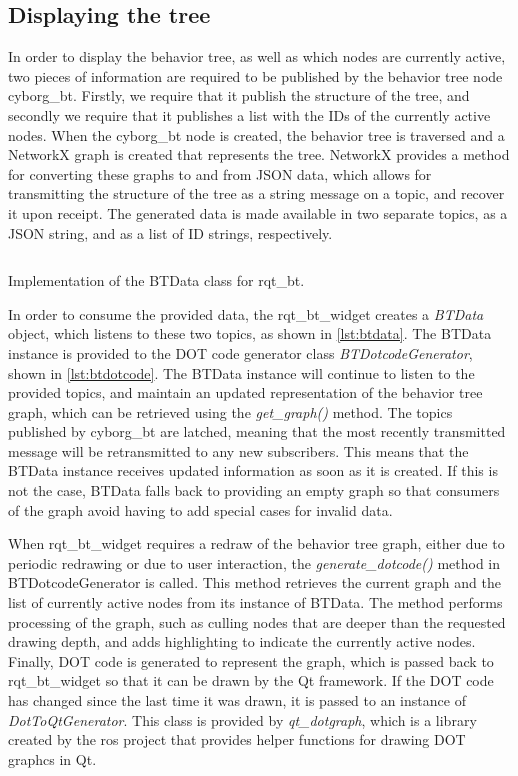 \documentclass[\rootfolder/main.tex]{subfiles}
\begin{document}
\subsection{Displaying the tree}

In order to display the behavior tree, as well as which nodes are currently active, two pieces of information are required to be published by the behavior tree node cyborg\_bt.
Firstly, we require that it publish the structure of the tree, and secondly we require that it publishes a list with the IDs of the currently active nodes.
When the cyborg\_bt node is created, the behavior tree is traversed and a NetworkX graph is created that represents the tree.
NetworkX provides a method for converting these graphs to and from JSON data, which allows for transmitting the structure of the tree as a string message on a topic, and recover it upon receipt.
The generated data is made available in two separate topics, as a JSON string, and as a list of ID strings, respectively.

\begin{listing}
    \inputminted{python}{\rootfolder/Chapters/Chapter4/Listings/btdata.py}
    \caption{Implementation of the BTData class for rqt\_bt.}
    \label{lst:btdata}
\end{listing}

In order to consume the provided data, the rqt\_bt\_widget creates a \emph{BTData} object, which listens to these two topics, as shown in \cref{lst:btdata}.
The BTData instance is provided to the DOT code generator class \emph{BTDotcodeGenerator}, shown in \cref{lst:btdotcode}.
The BTData instance will continue to listen to the provided topics, and maintain an updated representation of the behavior tree graph, which can be retrieved using the \emph{get\_graph()} method.
The topics published by cyborg\_bt are latched, meaning that the most recently transmitted message will be retransmitted to any new subscribers.
This means that the BTData instance receives updated information as soon as it is created.
If this is not the case, BTData falls back to providing an empty graph so that consumers of the graph avoid having to add special cases for invalid data.

When rqt\_bt\_widget requires a redraw of the behavior tree graph, either due to periodic redrawing or due to user interaction, the \emph{generate\_dotcode()} method in BTDotcodeGenerator is called.
This method retrieves the current graph and the list of currently active nodes from its instance of BTData.
The method performs processing of the graph, such as culling nodes that are deeper than the requested drawing depth, and adds highlighting to indicate the currently active nodes.
Finally, DOT code is generated to represent the graph, which is passed back to rqt\_bt\_widget so that it can be drawn by the Qt framework.
If the DOT code has changed since the last time it was drawn, it is passed to an instance of \emph{DotToQtGenerator}.
This class is provided by \emph{qt\_dotgraph}, which is a library created by the \acrshort{ros} project that provides helper functions for drawing DOT graphcs in Qt.
\end{document}
